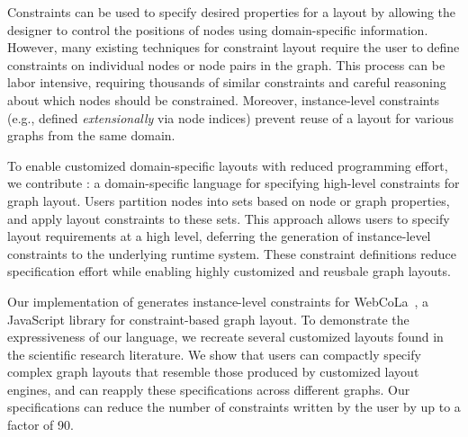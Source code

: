 
Constraints can be used to specify desired properties for a layout by
allowing the designer to control the positions of nodes using
domain-specific information.  However, many existing techniques
for constraint layout require the user to define constraints
on individual nodes or node pairs in the graph. This process can be labor
intensive, requiring thousands of similar constraints and careful reasoning
about which nodes should be constrained. Moreover, instance-level constraints 
(e.g., defined \emph{extensionally} via node indices) prevent
reuse of a layout for various graphs from the same domain.

To enable customized domain-specific layouts with reduced
programming effort, we contribute \projectname: a domain-specific language for
specifying high-level constraints for graph layout. Users partition nodes
into sets based on node or graph properties, and apply layout constraints
to these sets. This approach allows users to specify layout
requirements at a high level, deferring the generation of
instance-level constraints to the underlying runtime system. These constraint
definitions reduce specification effort while enabling highly
customized and reusbale graph layouts.

Our implementation of \projectname generates instance-level constraints for
WebCoLa~\cite{WebCoLa}, a JavaScript library for constraint-based graph
layout. To demonstrate the expressiveness of our language, we
recreate several customized layouts found in the scientific research 
literature. We
show that users can compactly specify complex graph layouts that resemble
those produced by customized layout engines, and can reapply these
specifications across different graphs. Our \projectname specifications
can reduce the number of constraints written by the user by up to a 
factor of 90.
